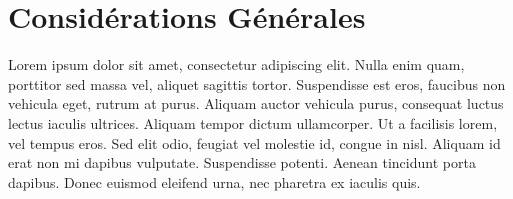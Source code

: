 \section{Considérations Générales}
Lorem ipsum dolor sit amet, consectetur adipiscing elit. Nulla enim quam, porttitor sed massa vel, aliquet sagittis tortor. Suspendisse est eros, faucibus non vehicula eget, rutrum at purus. Aliquam auctor vehicula purus, consequat luctus lectus iaculis ultrices. Aliquam tempor dictum ullamcorper. Ut a facilisis lorem, vel tempus eros. Sed elit odio, feugiat vel molestie id, congue in nisl. Aliquam id erat non mi dapibus vulputate. Suspendisse potenti. Aenean tincidunt porta dapibus. Donec euismod eleifend urna, nec pharetra ex iaculis quis.
